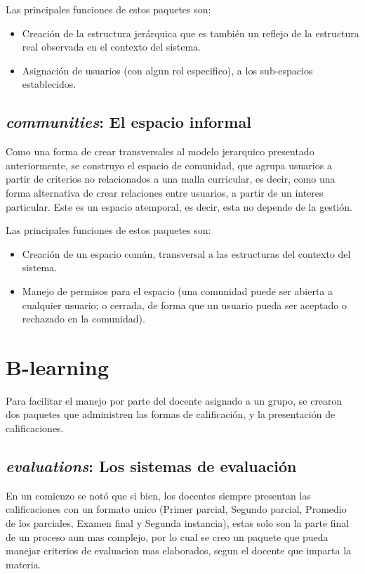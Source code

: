 Las principales funciones de estos paquetes son:

\begin{itemize}
\item Creación de la estructura jerárquica que es también un reflejo de la
estructura real observada en el contexto del sistema.
\item Asignación de usuarios (con algun rol especifico), a los sub-espacios
establecidos.
\end{itemize}

\subsection{\emph{communities}: El espacio informal}
Como una forma de crear transversales al modelo jerarquico presentado
anteriormente, se construyo el espacio de comunidad, que agrupa usuarios a
partir de criterios no relacionados a una malla curricular, es decir, como una
forma alternativa de crear relaciones entre usuarios, a partir de un interes
particular. Este es un espacio atemporal, es decir, esta no depende de la
gestión.

Las principales funciones de estos paquetes son:

\begin{itemize}
\item Creación de un espacio común, transversal a las estructuras del contexto
del sistema.
\item Manejo de permisos para el espacio (una comunidad puede ser abierta a
cualquier usuario; o cerrada, de forma que un usuario pueda ser aceptado o
rechazado en la comunidad).
\end{itemize}

\section{B-learning}
Para facilitar el manejo por parte del docente asignado a un grupo, se crearon
dos paquetes que administren las formas de calificación, y la presentación de
calificaciones.

\subsection{\emph{evaluations}: Los sistemas de evaluación}
En un comienzo se notó que si bien, los docentes siempre presentan las
calificaciones con un formato unico (Primer parcial, Segundo parcial, Promedio
de los parciales, Examen final y Segunda instancia), estas solo son la parte
final de un proceso aun mas complejo, por lo cual se creo un paquete que pueda
manejar criterios de evaluacion mas elaborados, segun el docente que imparta la
materia.

